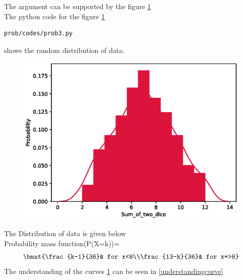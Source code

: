 \begin{enumerate}[label=\arabic*.,ref=\thesubsubsection.\theenumi]
\begin{enumerate}
The argument can be supported by the figure \ref{fig:figure1}
\\ 
The python code for the figure \ref{fig:figure1}
\begin{lstlisting}
prob/codes/prob3.py
\end{lstlisting}
shows the random distribution of data.
\begin{figure}[!ht]
\centering
\includegraphics[width=\columnwidth]{./prob/figs/prob3.eps}
\caption{}
\label{fig:figure1}
\end{figure}
The Distribution of data is given below
\\
Probability mass function(P(X=k))=
\begin{align}
\bmat{\frac{k-1}{36}& for x<8\\\frac{13-k}{36}& for x=>8}
\end{align}
The understanding of the curves \ref{fig:figure1} can be seen in \eqref{understandingcurve}
\end{enumerate}
\end{enumerate}